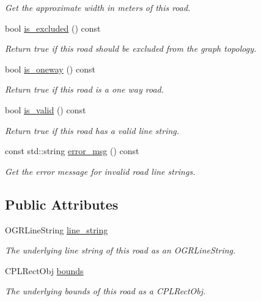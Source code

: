 \begin{DoxyCompactItemize}
\begin{DoxyCompactList}\small\item\em Get the approximate width in meters of this road. \end{DoxyCompactList}\item 
bool \hyperlink{classgeo_1_1Road_afdc7c8bacdac2e5976bf29a0e9ee5ce2}{is\+\_\+excluded} () const 
\begin{DoxyCompactList}\small\item\em Return true if this road should be excluded from the graph topology. \end{DoxyCompactList}\item 
bool \hyperlink{classgeo_1_1Road_aebf540cdc90e8cdad7d5fbaf2838ed0f}{is\+\_\+oneway} () const 
\begin{DoxyCompactList}\small\item\em Return true if this road is a one way road. \end{DoxyCompactList}\item 
bool \hyperlink{classgeo_1_1Road_a63163ca614d9d01b3e15bf06a0901ddb}{is\+\_\+valid} () const 
\begin{DoxyCompactList}\small\item\em Return true if this road has a valid line string. \end{DoxyCompactList}\item 
const std\+::string \hyperlink{classgeo_1_1Road_a32af3119496e802b14d9b1e3529b139b}{error\+\_\+msg} () const 
\begin{DoxyCompactList}\small\item\em Get the error message for invalid road line strings. \end{DoxyCompactList}\end{DoxyCompactItemize}
\subsection*{Public Attributes}
\begin{DoxyCompactItemize}
\item 
O\+G\+R\+Line\+String \hyperlink{classgeo_1_1Road_a00b051e682503788221079985a52e5fe}{line\+\_\+string}\hypertarget{classgeo_1_1Road_a00b051e682503788221079985a52e5fe}{}\label{classgeo_1_1Road_a00b051e682503788221079985a52e5fe}

\begin{DoxyCompactList}\small\item\em The underlying line string of this road as an O\+G\+R\+Line\+String. \end{DoxyCompactList}\item 
C\+P\+L\+Rect\+Obj \hyperlink{classgeo_1_1Road_ad862769d9ef8ce686ab11a65f93efc38}{bounds}\hypertarget{classgeo_1_1Road_ad862769d9ef8ce686ab11a65f93efc38}{}\label{classgeo_1_1Road_ad862769d9ef8ce686ab11a65f93efc38}

\begin{DoxyCompactList}\small\item\em The underlying bounds of this road as a C\+P\+L\+Rect\+Obj. \end{DoxyCompactList}\end{DoxyCompactItemize}
